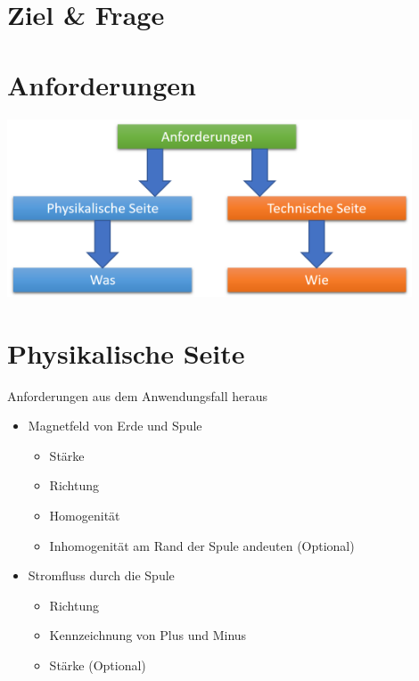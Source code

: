 \part{Ziel \& Frage}
\label{part:goal}

\part{Anforderungen}
\begin{frame}[fragile]{}
\begin{center}
\includegraphics[width=0.9\textwidth]{images/Anforderungen.png}
\end{center}
\end{frame}

\part{Physikalische Seite}
\begin{frame}[fragile]{Anforderungen aus dem Anwendungsfall heraus}
\begin{itemize}
\item Magnetfeld von Erde und Spule
\begin{itemize}
\item Stärke
\item Richtung
\item Homogenität
\item Inhomogenität am Rand der Spule andeuten (Optional) 
\end{itemize}
\item Stromfluss durch die Spule
\begin{itemize}
\item Richtung
\item Kennzeichnung von Plus und Minus
\item Stärke (Optional) 
\end{itemize}
\end{itemize}
\end{frame}

